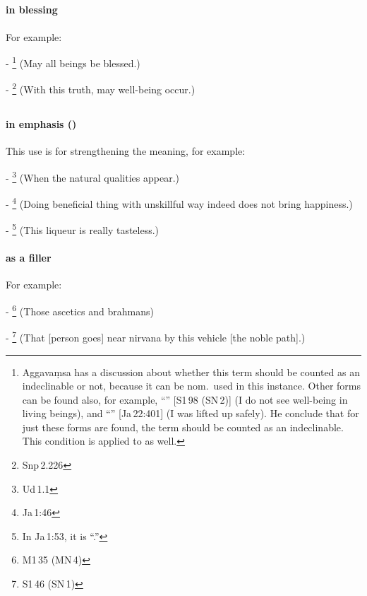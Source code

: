 \subsection*{}\label{nip:sotthi}\label{nip:suvatthi}
\paragraph*{ in blessing} For example:\par
- \footnote{Aggava\d msa has a discussion about whether this term should be counted as an indeclinable or not, because it can be nom.\ used in this instance. Other forms can be found also, for example, ``'' [S1\,98 (SN\,2)] (I do not see well-being in living beings), and ``'' [Ja\,22:401] (I was lifted up safely). He conclude that for just these forms are found, the term should be counted as an indeclinable. This condition is applied to  as well.} (May all beings be blessed.) \par
- \footnote{Snp\,2.226} (With this truth, may well-being occur.) \par

\subsection*{}\label{nip:have}\label{nip:ve}
\paragraph*{ in emphasis ()} This use is for strengthening the meaning, for example:\par
- \footnote{Ud\,1.1} (When the natural qualities appear.) \par
- \footnote{Ja\,1:46} (Doing beneficial thing with unskillful way indeed does not bring happiness.) \par
- \footnote{In Ja\,1:53, it is ``.''} (This liqueur is really tasteless.) \par
\paragraph*{ as a filler} For example:\par
- \footnote{M1\,35 (MN\,4)} (Those ascetics and brahmans) \par
- \footnote{S1\,46 (SN\,1)} (That [person goes] near nirvana by this vehicle [the noble path].) \par


